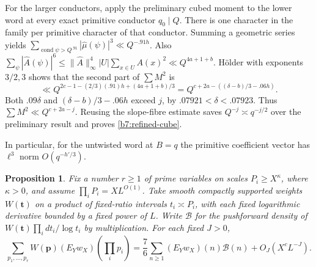 \documentclass[11pt,a4paper]{article}
\theoremstyle{paperplain}
\newtheorem{proposition}[theorem]{Proposition}
\numberwithin{equation}{section}
\begin{document}
For the larger conductors, apply the preliminary cubed moment to the
lower word at every exact primitive conductor \(q_0\mid Q\).
There is one character in the family per primitive character of that
conductor. Summing a geometric series yields
\(\sum_{\operatorname{cond}\psi>Q^{.91}}|\widehat\mu(\psi)|^3
\ll Q^{-.91h}\).
Also
\(\sum_\psi |\widehat A(\psi)|^6
\le\|\widehat A\|_\infty^4 |U|\sum_{x\in U}A(x)^2
\ll Q^{4a+1+b}\).
H\"older with exponents \(3/2,3\) shows that the second part of
\(\sum M^2\) is
\[
 \ll Q^{2c-1-(2/3)(.91)h+(4a+1+b)/3}
 = Q^{c+2a-((\delta-b)/3-.06h)}.
\]
Both \(.09\delta\) and \((\delta-b)/3-.06h\) exceed \(j\), by
\(.07921<\delta<.07923\). Thus \(\sum M^2\ll Q^{c+2a-j}\).
Reusing the slope-fibre estimate saves \(Q^{-j}\asymp q^{-j/2}\)
over the preliminary result and proves \eqref{b7:refined-cube}.


In particular, for the untwisted word at $B=q$ the primitive
coefficient vector has $\ell^3$ norm $O(q^{-h'/3})$.

\begin{proposition}\label{b7:initial-projection}
Fix a number \(r\ge1\) of prime variables on scales
\(P_i\ge X^\kappa\), where \(\kappa>0\), and assume
\(\prod_i P_i=X L^{O(1)}\). Take smooth compactly supported weights
\(W(\mathbf t)\) on a product of fixed-ratio intervals \(t_i\asymp P_i\),
with each fixed logarithmic derivative bounded by a fixed power of \(L\).
Write \(\mathcal B\) for the pushforward density of
\(W(\mathbf t)\prod_i dt_i/\log t_i\) by multiplication.
For each fixed \(J>0\),
\[
 \sum_{p_1,\ldots,p_r} W(\mathbf p)(E_Yw_X)(\textstyle\prod_i p_i)
 =\frac{7}{6}\sum_{n\ge1}(E_Y w_X)(n)\mathcal B(n)
   +O_J(X^c L^{-J}).
\]
\end{proposition}
\end{document}
